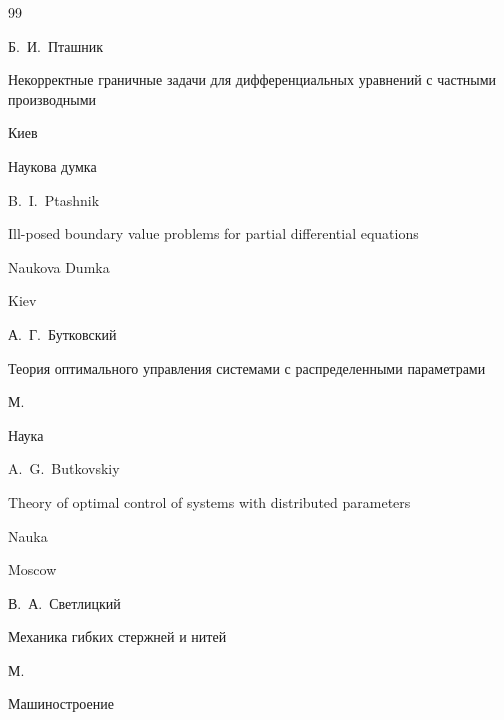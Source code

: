 \begin{thebibliography}{99}


\by Б.~И.~Пташник

\book Некорректные граничные задачи для дифференциальных уравнений с частными производными

\publaddr Киев

\publ Наукова думка



\misctransl

\by B.~I.~Ptashnik

\book Ill-posed boundary value problems for partial differential equations

\publ Naukova Dumka

\publaddr Kiev






\by А.~Г.~Бутковский

\book Теория оптимального управления системами с распределенными параметрами

\publaddr М.

\publ Наука



\misctransl

\by A.~G.~Butkovskiy

\book Theory of optimal control of systems with distributed parameters

\publ Nauka

\publaddr Moscow 










\by В.~А.~Светлицкий

\book Механика гибких стержней и нитей

\publaddr М.

\publ Машиностроение



\misctransl


\end{thebibliography}

